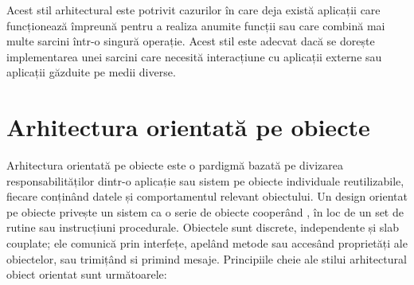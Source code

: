 \documentclass[12pt, a4paper, oneside, romanian]{teza-upb}
\begin{document}
Acest stil arhitectural este potrivit cazurilor în care deja există aplicații care funcționează împreună pentru a realiza anumite funcții sau care combină mai multe sarcini într-o singură operație. Acest stil este adecvat dacă se dorește implementarea unei sarcini care necesită interacțiune cu aplicații externe sau aplicații găzduite pe medii diverse.

\section{Arhitectura orientată pe obiecte}
Arhitectura orientată pe obiecte este o pardigmă bazată pe divizarea responsabilităților dintr-o aplicație sau sistem pe obiecte individuale reutilizabile, fiecare conținând datele și comportamentul relevant obiectului. Un design orientat pe obiecte privește un sistem ca o serie de obiecte cooperând , în loc de un set de rutine sau instrucțiuni procedurale. Obiectele sunt discrete, independente și slab couplate; ele comunică prin interfețe, apelând metode sau accesând proprietăți ale obiectelor, sau trimițând si primind mesaje.
Principiile cheie ale stilui arhitectural obiect orientat sunt următoarele:
\end{document}
